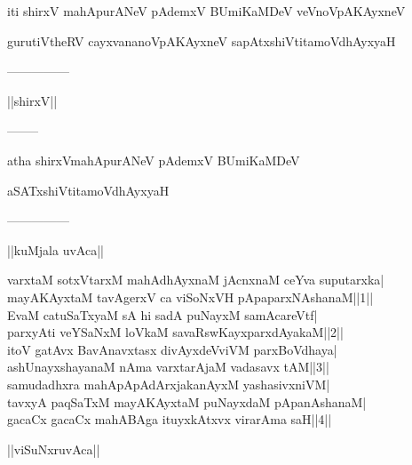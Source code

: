\documentclass{article}
\begin{document}
\begin{center}
iti shirxV mahApurANeV pAdemxV BUmiKaMDeV veVnoVpAKAyxneV
\end{center}

\begin{center}
gurutiVtheRV cayxvananoVpAKAyxneV sapAtxshiVtitamoVdhAyxyaH
\end{center}

\begin{center}
---------------
\end{center}

\begin{center}
||shirxV||
\end{center}

\begin{center}
--------
\end{center}

\begin{center}
atha shirxVmahApurANeV pAdemxV BUmiKaMDeV
\end{center}

\begin{center}
aSATxshiVtitamoVdhAyxyaH
\end{center}

\begin{center}
---------------
\end{center}

\begin{center}
||kuMjala uvAca||
\end{center}

varxtaM sotxVtarxM mahAdhAyxnaM jAcnxnaM ceYva suputarxka|\\
mayAKAyxtaM tavAgerxV ca viSoNxVH pApaparxNAshanaM||1||\\
EvaM catuSaTxyaM sA hi sadA puNayxM samAcareVtf|\\
parxyAti veYSaNxM loVkaM savaRswKayxparxdAyakaM||2||\\
itoV gatAvx BavAnavxtasx divAyxdeVviVM parxBoVdhaya|\\
ashUnayxshayanaM nAma varxtarAjaM vadasavx tAM||3||\\
samudadhxra mahApApAdArxjakanAyxM yashasivxniVM|\\
tavxyA paqSaTxM mayAKAyxtaM puNayxdaM pApanAshanaM|\\
gacaCx gacaCx mahABAga ituyxkAtxvx virarAma saH||4||\\

\begin{center}
||viSuNxruvAca||
\end{center}
\end{document}
